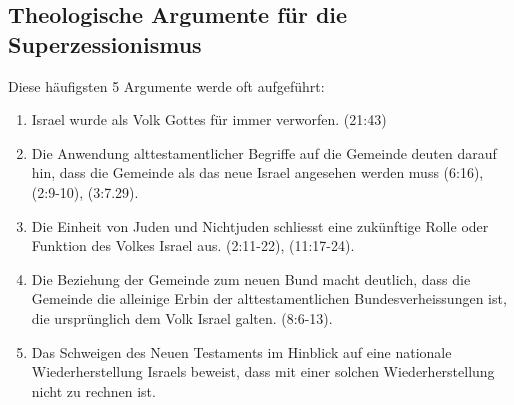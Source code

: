 \documentclass[fontsize=14pt]{../../inc/mybib}
\newcommand{\sz}{Superzessionismus}
\begin{document}
    \subsection{Theologische Argumente für die \sz}
    Diese häufigsten 5 Argumente werde oft aufgeführt:
    \begin{enumerate}
        \item Israel wurde als Volk Gottes für immer verworfen. (21:43)
        \item Die Anwendung alttestamentlicher Begriffe auf die Gemeinde deuten darauf hin, dass die Gemeinde als das neue Israel angesehen werden muss (6:16), (2:9-10), (3:7.29).
        \item Die Einheit von Juden und Nichtjuden schliesst eine zukünftige Rolle oder Funktion des Volkes Israel aus. (2:11-22), (11:17-24).
        \item Die Beziehung der Gemeinde zum neuen Bund macht deutlich, dass die Gemeinde die alleinige Erbin der alttestamentlichen Bundesverheissungen ist, die ursprünglich dem Volk Israel galten. (8:6-13).
        \item Das Schweigen des Neuen Testaments im Hinblick auf eine nationale Wiederherstellung Israels beweist, dass mit einer solchen Wiederherstellung nicht zu rechnen ist.
    \end{enumerate}
    \newpage
   
\renewcommand{\arraystretch}{1.3} %
\end{document}
